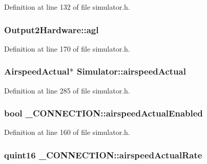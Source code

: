Definition at line 132 of file simulator.\-h.

\hypertarget{group___h_i_t_l_plugin_ga40e8c62b6079618b6541408ce3dafe0c}{
\subsubsection[{agl}]{ Output2\-Hardware\-::agl}}\label{group___h_i_t_l_plugin_ga40e8c62b6079618b6541408ce3dafe0c}


Definition at line 170 of file simulator.\-h.

\hypertarget{group___h_i_t_l_plugin_gadba0d3a66c5a15e0027b7d95fc9498b4}{
\subsubsection[{airspeed\-Actual}]{\setlength{\rightskip}{0pt plus 5cm}Airspeed\-Actual$\ast$ Simulator\-::airspeed\-Actual\hspace{0.3cm}{\ttfamily [protected]}}}\label{group___h_i_t_l_plugin_gadba0d3a66c5a15e0027b7d95fc9498b4}


Definition at line 285 of file simulator.\-h.

\hypertarget{group___h_i_t_l_plugin_ga8fc341e96193fe41625a04a534a16387}{
\subsubsection[{airspeed\-Actual\-Enabled}]{\setlength{\rightskip}{0pt plus 5cm}bool \-\_\-\-C\-O\-N\-N\-E\-C\-T\-I\-O\-N\-::airspeed\-Actual\-Enabled}}\label{group___h_i_t_l_plugin_ga8fc341e96193fe41625a04a534a16387}


Definition at line 160 of file simulator.\-h.

\hypertarget{group___h_i_t_l_plugin_gacb3c852192e75845b2a17679c94a10c1}{
\subsubsection[{airspeed\-Actual\-Rate}]{\setlength{\rightskip}{0pt plus 5cm}quint16 \-\_\-\-C\-O\-N\-N\-E\-C\-T\-I\-O\-N\-::airspeed\-Actual\-Rate}}\label{group___h_i_t_l_plugin_gacb3c852192e75845b2a17679c94a10c1}


